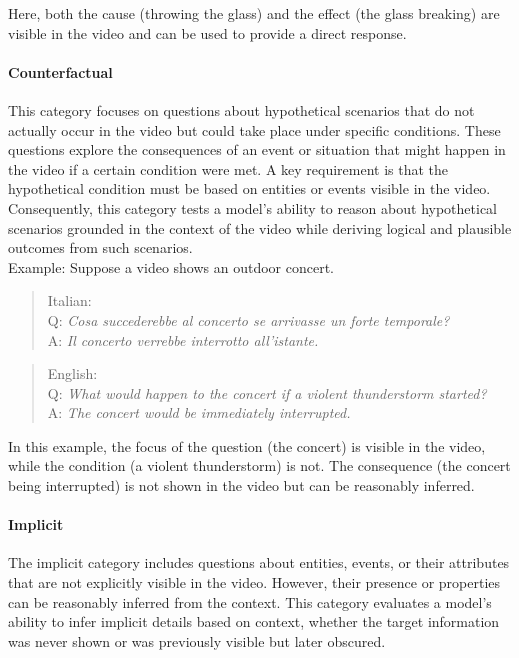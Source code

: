 \begin{itemize}
\begin{quote}
    \end{quote}
    Here, both the cause (throwing the glass) and the effect (the glass breaking) are visible in the video and can be used to provide a direct response.



\end{itemize}



\paragraph{{\textbf{Counterfactual}}}
This category focuses on questions about hypothetical scenarios that do not actually occur in the video but could take place under specific conditions. These questions explore the consequences of an event or situation that might happen in the video if a certain condition were met. A key requirement is that the hypothetical condition must be based on entities or events visible in the video.
Consequently, this category tests a model's ability to reason about hypothetical scenarios grounded in the context of the video while deriving logical and plausible outcomes from such scenarios.\\
Example: Suppose a video shows an outdoor concert.
\begin{quote}
        Italian:\\
Q: \textit{Cosa succederebbe al concerto se arrivasse un forte temporale?}\\
A: \textit{Il concerto verrebbe interrotto all'istante.}\\

    \end{quote}
    
\begin{quote}
        English:\\
Q: \textit{What would happen to the concert if a violent thunderstorm started?}\\
A: \textit{The concert would be immediately interrupted.}\\

    \end{quote}
    
In this example, the focus of the question (the concert) is visible in the video, while the condition (a violent thunderstorm) is not. The consequence (the concert being interrupted) is not shown in the video but can be reasonably inferred.


\paragraph{{\textbf{Implicit}}}
The implicit category includes questions about entities, events, or their attributes that are not explicitly visible in the video. However, their presence or properties can be reasonably inferred from the context. This category evaluates a model’s ability to infer implicit details based on context, whether the target information was never shown or was previously visible but later obscured.

